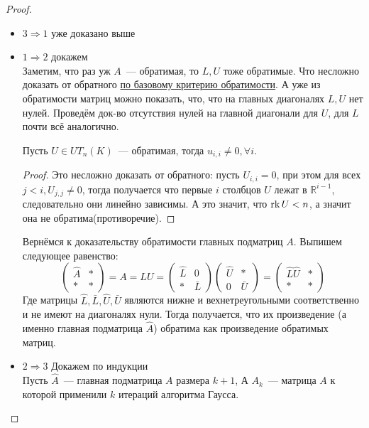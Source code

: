 \begin{proof}\leavevmode
    \begin{itemize}
        \item $3\Rightarrow 1$ уже доказано выше
        \item  $1\Rightarrow 2$ докажем\\
            Заметим, что раз уж $A$~--- обратимая, то $L, U$ тоже обратимые. Что несложно доказать
            от обратного \hyperref[stm:Базовый критерий обратимости]{по базовому критерию обратимости}.
            А уже из обратимости матриц можно показать, что, что на главных диагоналях $L, U$ нет нулей. 
            Проведём док-во отсутствия нулей на главной диагонали для $U$, для $L$ почти всё аналогично.

            \begin{lemma}
                Пусть $U\in UT_n(K)$~--- обратимая, тогда $u_{i,i}\not=0, \forall i$.
            \end{lemma}
            \begin{proof}
                Это несложно доказать от обратного: пусть $U_{i,i} = 0$, при этом для всех $j < i, U_{j,j}\not=0$, тогда получается
                что первые $i$ столбцов $U$ лежат в $\mathbb{R}^{i-1}$, следовательно они линейно зависимы. А это значит, что
                $\operatorname{rk} U < n$, а значит она не обратима(противоречие).
            \end{proof}
            Вернёмся к доказательству обратимости главных подматриц $A$. Выпишем следующее равенство:
            \[
            \left(\begin{array}{c|c}
                    \hat{A} & * \\
                    \hline
                    * & *
            \end{array}\right) = A = LU = 
            \left(\begin{array}{c|c}
                    \hat{L} & 0\\
                    \hline
                    * & \bar{L}
            \end{array}\right)
            \left(\begin{array}{c|c}
                    \hat{U} & *\\
                    \hline
                    0 & \bar{U}
            \end{array}\right) =
            \left(\begin{array}{c|c}
                    \hat{L} \hat{U} & *\\
                    \hline
                    * & *
            \end{array}\right)
            \] 
            Где матрицы $\hat{L}, \bar{L}, \hat{U}, \bar{U}$ являются нижне и вехнетреугольными соответственно и не
            имеют на диагоналях нули.
            Тогда получается, что их произведение (а именно главная подматрица $\hat{A}$) обратима как 
            произведение обратимых матриц.
        \item $2\Rightarrow 3$ Докажем по индукции\\
            Пусть $\hat{A}$~--- главная подматрица $A$ размера $k + 1$,
            А $A_k$~--- матрица $A$ к которой применили $k$ итераций алгоритма Гаусса.


\end{itemize}
\end{proof}
